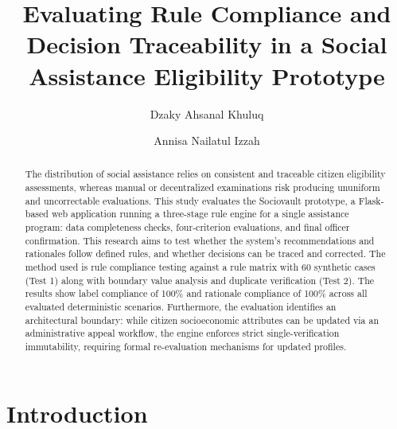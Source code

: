 \documentclass[runningheads]{llncs}
\begin{document}
\title{Evaluating Rule Compliance and Decision Traceability in a Social Assistance Eligibility Prototype}

\author{Dzaky Ahsanal Khuluq \and Annisa Nailatul Izzah}


\maketitle

\begin{abstract}
The distribution of social assistance relies on consistent and traceable citizen eligibility assessments, whereas manual or decentralized examinations risk producing ununiform and uncorrectable evaluations. This study evaluates the Sociovault prototype, a Flask-based web application running a three-stage rule engine for a single assistance program: data completeness checks, four-criterion evaluations, and final officer confirmation. This research aims to test whether the system's recommendations and rationales follow defined rules, and whether decisions can be traced and corrected. The method used is rule compliance testing against a rule matrix with 60 synthetic cases (Test 1) along with boundary value analysis and duplicate verification (Test 2). The results show label compliance of 100\% and rationale compliance of 100\% across all evaluated deterministic scenarios. Furthermore, the evaluation identifies an architectural boundary: while citizen socioeconomic attributes can be updated via an administrative appeal workflow, the engine enforces strict single-verification immutability, requiring formal re-evaluation mechanisms for updated profiles.

\end{abstract}

\section{Introduction}
\end{document}
